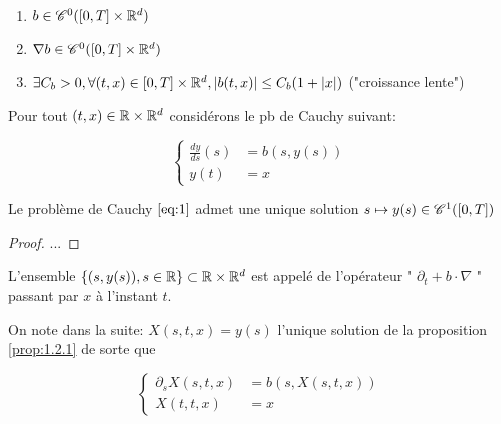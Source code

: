 \documentclass[french,a4paper,10pt]{article}
\begin{document}
           
            \begin{enumerate}
                \item $b \in \mathscr{C}^0(\mathopen{}\left[0,T\right]\mathclose{}\times \mathbb{R}^d)$
                
                \item $\nabla b \in \mathscr{C}^0(\mathopen{}\left[0,T\right]\mathclose{}\times \mathbb{R}^d)$

                \item $\exists C_b>0, \forall (t,x)\in \mathopen{}\left[0,T\right]\mathclose{} \times \mathbb{R}^d, \mathopen{}\left|b(t,x)\right|\mathclose{} \leq C_b(1+\mathopen{}\left|x\right|\mathclose{})$ ("croissance lente")
            \end{enumerate}
            
            Pour tout $(t,x)\in \mathbb{R} \times \mathbb{R}^d$ considérons le pb de Cauchy suivant:
            
            \begin{equation}
                \begin{cases}
                \frac{dy}{ds}(s) & = b(s,y(s)) \\ 
                y(t) & = x  
                \end{cases}\label{eq:1}
            \end{equation}
            
            
            \begin{proposition}\label{prop:1.2.1}
                Le problème de Cauchy $\eqref{eq:1}$ admet une unique solution $s\mapsto y(s) \in \mathscr{C}^1(\mathopen{}\left[0,T\right]\mathclose{})$
            \end{proposition}
            
            \begin{proof}
                ...
            \end{proof}

            \begin{definition}\label{def:1.2.2}
                L'ensemble $\{ (s,y(s)),s\in \mathbb{R}\} \subset \mathbb{R} \times \mathbb{R}^d$ est appelé  de l'opérateur " $\partial_t + b \cdot \nabla$ " passant par $x$ à l'instant $t$.
            \end{definition}

            \begin{remark}\label{rem:1.2.3}
                On note dans la suite: $X(s,t,x) = y(s)$ l'unique solution de la proposition \ref{prop:1.2.1} de sorte que 
                
            \begin{equation*}
                \begin{cases}
                    \partial_s X(s,t,x) &= b(s,X(s,t,x)) \\
                    X(t,t,x)& = x
                \end{cases}
            \end{equation*}
                
            \end{remark}
\end{document}
